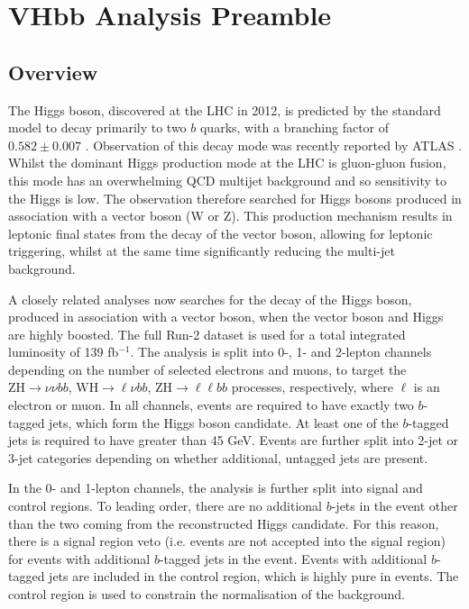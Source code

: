 \chapter{VHbb Analysis Preamble}
\label{chap:vhbbpre}

\section{Overview}

The Higgs boson, discovered at the LHC in 2012, is predicted by the standard model to decay primarily to two $b$ quarks, with a branching factor of $0.582 \pm 0.007$ \cite{2016arXiv161007922D:2016:higgs}. Observation of this decay mode was recently reported by ATLAS \cite{Aaboud_2018:2018:vhbbObs}. Whilst the dominant Higgs production mode at the LHC is gluon-gluon fusion, this mode has an overwhelming QCD multijet background and so sensitivity to the Higgs is low. The \hbb observation therefore searched for Higgs bosons produced in association with a vector boson (W or Z). This production mechanism results in leptonic final states from the decay of the vector boson, allowing for leptonic triggering, whilst at the same time significantly reducing the multi-jet background. 

A closely related analyses now searches for the \hbb decay of the Higgs boson, produced in association with a vector boson, when the vector boson and Higgs are highly boosted. The full Run-2 dataset is used for a total integrated luminosity of 139 fb$^{-1}$. The analysis is split into 0-, 1- and 2-lepton channels depending on the number of selected electrons and muons, to target the $\text{ZH} \rightarrow \nu\nu bb$, $\text{WH} \rightarrow \ell\nu bb$, $\text{ZH} \rightarrow \ell\ell bb$ processes, respectively, where $\ell$ is an electron or muon. In all channels, events are required to have exactly two $b$-tagged jets, which form the Higgs boson candidate. At least one of the $b$-tagged jets is required to have \pT greater than 45 GeV. Events are further split into 2-jet or 3-jet categories depending on whether additional, untagged jets are present. 

In the 0- and 1-lepton channels, the analysis is further split into signal and control regions. To leading order, there are no additional $b$-jets in the event other than the two coming from the reconstructed Higgs candidate. For this reason, there is a signal region veto (i.e. events are not accepted into the signal region) for events with additional $b$-tagged jets in the event. Events with additional $b$-tagged jets are included in the control region, which is highly pure in \ttbar events. The control region is used to constrain the normalisation of the \ttbar background.
